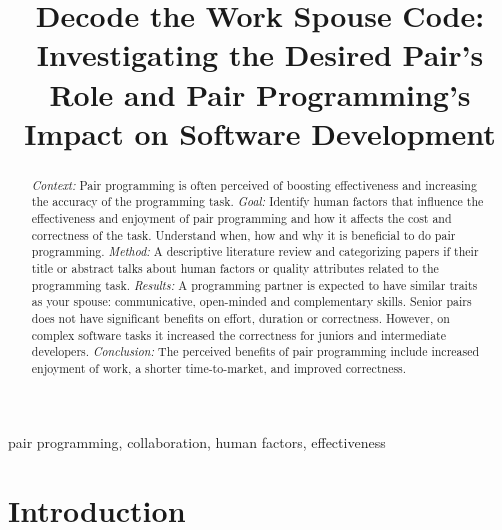 \documentclass[conference]{IEEEtran}
\begin{document}
\title{Decode the Work Spouse Code: Investigating the Desired Pair's Role and Pair Programming's Impact on Software Development}


\author{
}

\maketitle

\begin{abstract}
\textit{Context:} Pair programming is often perceived of boosting effectiveness and increasing the accuracy of the programming task.
\textit{Goal:} Identify human factors that influence the effectiveness and enjoyment of pair programming and how it affects the cost and correctness of the task. Understand when, how and why it is beneficial to do pair programming.
\textit{Method:} A descriptive literature review and categorizing papers if their title or abstract talks about human factors or quality attributes related to the programming task.
\textit{Results:} A programming partner is expected to have similar traits as your spouse: communicative, open-minded and complementary skills. Senior pairs does not have significant benefits on effort, duration or correctness. However, on complex software tasks it increased the correctness for juniors and intermediate developers. 
\textit{Conclusion:} The perceived benefits of pair programming include increased enjoyment of work, a shorter time-to-market, and improved correctness.
\end{abstract}

\begin{IEEEkeywords}
pair programming, collaboration, human factors, effectiveness
\end{IEEEkeywords}

\section{Introduction}
\end{document}
